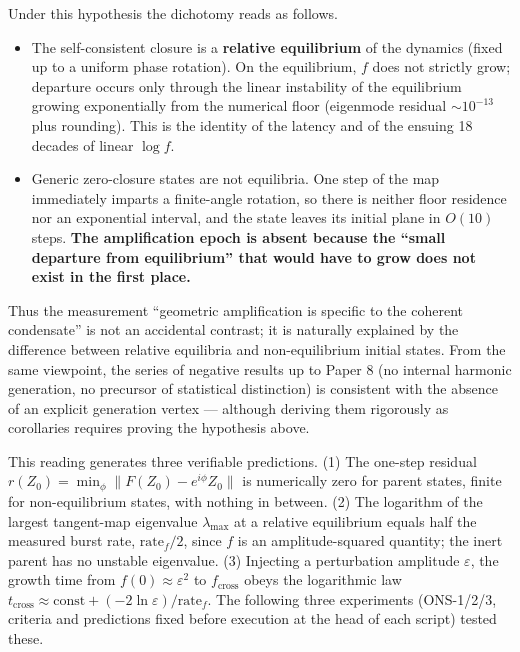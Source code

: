 \documentclass[
  a4paper,
]{article}
\providecommand{\tightlist}{%
  \setlength{\itemsep}{0pt}\setlength{\parskip}{0pt}}
\begin{document}
Under this hypothesis the dichotomy reads as follows.

\begin{itemize}
\tightlist
\item
  The self-consistent closure is a \textbf{relative equilibrium} of the
  dynamics (fixed up to a uniform phase rotation). On the equilibrium,
  \(f\) does not strictly grow; departure occurs only through the linear
  instability of the equilibrium growing exponentially from the
  numerical floor (eigenmode residual \(\sim10^{-13}\) plus rounding).
  This is the identity of the latency and of the ensuing 18 decades of
  linear \(\log f\).
\item
  Generic zero-closure states are not equilibria. One step of the map
  immediately imparts a finite-angle rotation, so there is neither floor
  residence nor an exponential interval, and the state leaves its
  initial plane in \(O(10)\) steps. \textbf{The amplification epoch is
  absent because the ``small departure from equilibrium'' that would
  have to grow does not exist in the first place.}
\end{itemize}

Thus the measurement ``geometric amplification is specific to the
coherent condensate'' is not an accidental contrast; it is naturally
explained by the difference between relative equilibria and
non-equilibrium initial states. From the same viewpoint, the series of
negative results up to Paper 8 (no internal harmonic generation, no
precursor of statistical distinction) is consistent with the absence of
an explicit generation vertex --- although deriving them rigorously as
corollaries requires proving the hypothesis above.

This reading generates three verifiable predictions. (1) The one-step
residual \(r(Z_0)=\min_\phi\lVert F(Z_0)-e^{i\phi}Z_0\rVert\) is
numerically zero for parent states, finite for non-equilibrium states,
with nothing in between. (2) The logarithm of the largest tangent-map
eigenvalue \(\lambda_{\max}\) at a relative equilibrium equals half the
measured burst rate, \(\text{rate}_f/2\), since \(f\) is an
amplitude-squared quantity; the inert parent has no unstable eigenvalue.
(3) Injecting a perturbation amplitude \(\varepsilon\), the growth time
from \(f(0)\approx\varepsilon^2\) to \(f_{\mathrm{cross}}\) obeys the
logarithmic law
\(t_{\mathrm{cross}}\approx\text{const}+(-2\ln\varepsilon)/\text{rate}_f\).
The following three experiments (ONS-1/2/3, criteria and predictions
fixed before execution at the head of each script) tested these.
\end{document}
